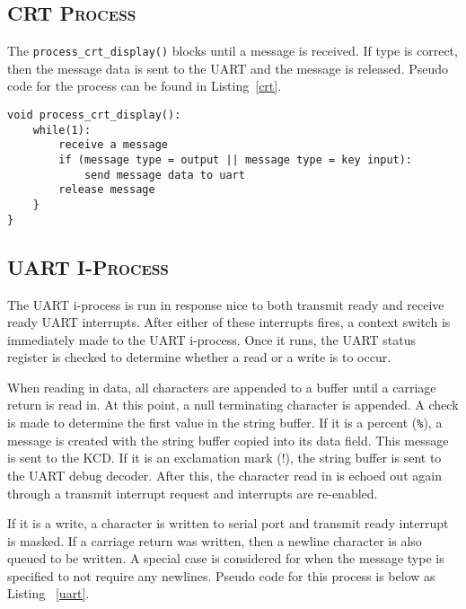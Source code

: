 \documentclass[oneside]{report}
\begin{document}
\subsection{\textsc{CRT Process}}
The \texttt{process\_crt\_display()} blocks until a message is
received. If type is correct, then the message data is sent to the
UART and the message is released. Pseudo code for the
process can be found in Listing~\ref{crt}.

\begin{lstlisting}
void process_crt_display():
    while(1):
        receive a message
        if (message type = output || message type = key input):
            send message data to uart
        release message
    }
}
\end{lstlisting}

\subsection{\textsc{UART I-Process}}
The UART i-process is run in response nice to both transmit ready and
receive ready UART interrupts. After either of these interrupts fires,
a context switch is immediately made to the UART i-process. Once it
runs, the UART status register is checked to determine whether a read
or a write is to occur.

When reading in data, all characters are appended to a buffer until a carriage
return is read in. At this point, a null terminating character is appended.  A
check is made to determine the first value in the string buffer. If it is a
percent (\texttt{\%}), a message is created with the string buffer copied into its data
field. This message is sent to the KCD. If it is an exclamation mark (!), the
string buffer is sent to the UART debug decoder. After this, the character read
in is echoed out again through a transmit interrupt request and interrupts are
re-enabled. 

If it is a write, a character is written to serial port and transmit
ready interrupt is masked. If a carriage return was written, then a
newline character is also queued to be written. A special case is
considered for when the message type is specified to not require any
newlines. Pseudo code for this process is below as Listing
~\ref{uart}.
\end{document}
